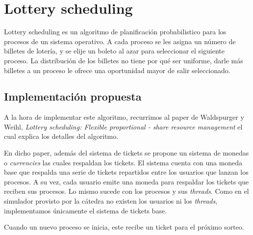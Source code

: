 \section{Lottery scheduling}
Lottery scheduling es un algoritmo de planificaci\'on probabilistico para los procesos de un sistema operativo. A cada proceso se les asigna un n\'umero de billetes de loter\'ia, y se elije un boleto al azar para seleccionar el siguiente proceso. La distribución de los billetes no tiene por qu\'e ser uniforme, darle más billetes a un proceso le ofrece una oportunidad mayor de salir seleccionado.
\subsection{Implementaci\'on propuesta}
A la hora de implementar este algoritmo, recurrimos al paper de Waldspurger y Weihl, \textit{Lottery scheduling: Flexible proportional - share resource management} el cual explica los detalles del algoritmo. 

En dicho paper, adem\'as del sistema de tickets se propone un sistema de monedas o \textit{currencies} las cuales respaldan los tickets. El sistema cuenta con una moneda base que respalda una serie de tickets repartidos entre los usuarios que lanzan los procesos. A su vez, cada usuario emite una moneda para respaldar los tickets que reciben sus procesos. Lo mismo sucede con los procesos y sus \textit{threads}. Como en el simulador provisto por la c\'atedra no existen los usuarios ni los \textit{threads}, implementamos \'unicamente el sistema de tickets base.

Cuando un nuevo proceso se inicia, este recibe un ticket para el pr\'oximo sorteo.